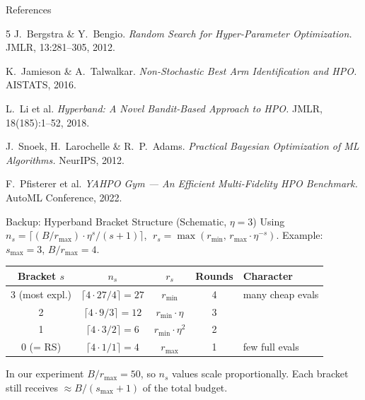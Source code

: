 \documentclass[t,english]{beamer}
\begin{document}
\appendix

\begin{frame}[allowframebreaks]{References}
  \begin{thebibliography}{5}
    \small
      J.~Bergstra \& Y.~Bengio.
      \textit{Random Search for Hyper-Parameter Optimization.}
      JMLR, 13:281--305, 2012.

      K.~Jamieson \& A.~Talwalkar.
      \textit{Non-Stochastic Best Arm Identification and HPO.}
      AISTATS, 2016.

      L.~Li et al.
      \textit{Hyperband: A Novel Bandit-Based Approach to HPO.}
      JMLR, 18(185):1--52, 2018.

      J.~Snoek, H.~Larochelle \& R.~P.~Adams.
      \textit{Practical Bayesian Optimization of ML Algorithms.}
      NeurIPS, 2012.

      F.~Pfisterer et al.
      \textit{YAHPO Gym — An Efficient Multi-Fidelity HPO Benchmark.}
      AutoML Conference, 2022.
  \end{thebibliography}
\end{frame}


\begin{frame}{Backup: Hyperband Bracket Structure (Schematic, $\eta{=}3$)}
  Using $n_s = \lceil(B/r_{\max})\cdot\eta^s/(s+1)\rceil$,
  $\;r_s = \max(r_{\min},\, r_{\max}\cdot\eta^{-s})$.
  Example: $s_{\max}=3$, $B/r_{\max}=4$.

  \medskip
  \renewcommand{\tabcolsep}{5pt}
  \renewcommand{\arraystretch}{1.15}
  \begin{center}
  \begin{footnotesize}
  \begin{tabular}{ccccl}
    \toprule
    \textbf{Bracket} $s$ & $n_s$ & $r_s$ & Rounds & Character \\
    \midrule
    3 (most expl.) & $\lceil 4{\cdot}27/4\rceil=27$ & $r_{\min}$            & 4 & many cheap evals \\
    2              & $\lceil 4{\cdot}9/3\rceil=12$  & $r_{\min}{\cdot}\eta$ & 3 & \\
    1              & $\lceil 4{\cdot}3/2\rceil=6$   & $r_{\min}{\cdot}\eta^2$ & 2 & \\
    0 (= RS)       & $\lceil 4{\cdot}1/1\rceil=4$   & $r_{\max}$            & 1 & few full evals \\
    \bottomrule
  \end{tabular}
  \end{footnotesize}
  \end{center}
  \smallskip
  In our experiment $B/r_{\max}=50$, so $n_s$ values scale proportionally.
  Each bracket still receives $\approx B/(s_{\max}+1)$ of the total budget.
\end{frame}
\end{document}
